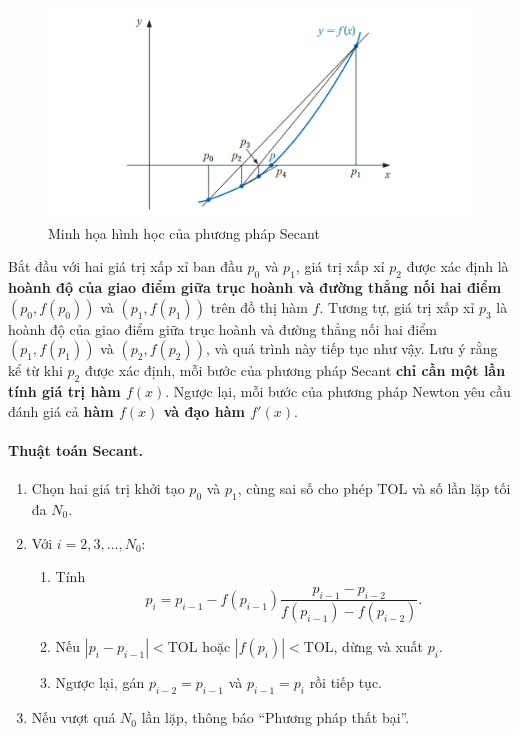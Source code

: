 \begin{figure}[H]
    \centering
    \includegraphics[width=1\linewidth]{figures/secant.png}
    \caption{Minh họa hình học của phương pháp Secant}
    \label{fig:placeholder}
\end{figure}

Bắt đầu với hai giá trị xấp xỉ ban đầu $p_0$ và $p_1$, 
giá trị xấp xỉ $p_2$ được xác định là \textbf{hoành độ của giao điểm giữa trục hoành và đường thẳng nối hai điểm} $(p_0, f(p_0))$ và $(p_1, f(p_1))$ trên đồ thị hàm $f$. Tương tự, giá trị xấp xỉ $p_3$ là hoành độ của giao điểm giữa trục hoành và đường thẳng nối hai điểm $(p_1, f(p_1))$ và $(p_2, f(p_2))$, và quá trình này tiếp tục như vậy.
Lưu ý rằng kể từ khi $p_2$ được xác định, mỗi bước của phương pháp Secant \textbf{chỉ cần một lần tính giá trị hàm $f(x)$}. 
Ngược lại, mỗi bước của phương pháp Newton yêu cầu đánh giá cả 
\textbf{hàm $f(x)$ và đạo hàm $f'(x)$}.

\paragraph*{Thuật toán Secant.}
\begin{enumerate}
    \item Chọn hai giá trị khởi tạo $p_0$ và $p_1$, cùng sai số cho phép $\text{TOL}$ và số lần lặp tối đa $N_0$.
    \item Với $i = 2, 3, \ldots, N_0$:
    \begin{enumerate}
        \item Tính
        \[
            p_i = p_{i-1} - f(p_{i-1})
            \frac{p_{i-1} - p_{i-2}}{f(p_{i-1}) - f(p_{i-2})}.
        \]
        \item Nếu $|p_i - p_{i-1}| < \text{TOL}$ hoặc $|f(p_i)| < \text{TOL}$, dừng và xuất $p_i$.
        \item Ngược lại, gán $p_{i-2} = p_{i-1}$ và $p_{i-1} = p_i$ rồi tiếp tục.
    \end{enumerate}
    \item Nếu vượt quá $N_0$ lần lặp, thông báo “Phương pháp thất bại”.
\end{enumerate}

